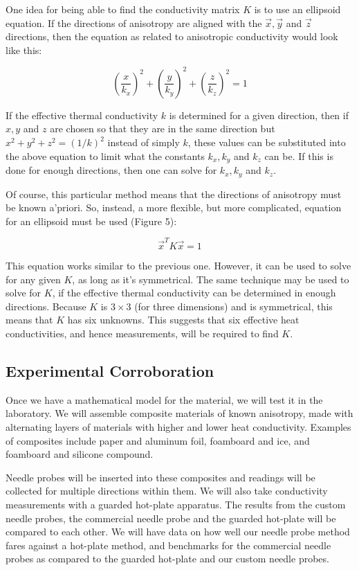 \documentclass[12pt, letterpaper]{article}
\begin{document}
One idea for being able to find the conductivity matrix \(K\) is to use an ellipsoid equation. If the directions of anisotropy are aligned with the \(\vec{x}, \vec{y}\) and \(\vec{z}\) directions, then the equation as related to anisotropic conductivity would look like this:

\begin{equation*}
\left(\frac{x}{k_x}\right)^2 + \left(\frac{y}{k_y}\right)^2 + \left(\frac{z}{k_z}\right)^2 = 1
\end{equation*}

If the effective thermal conductivity \(k\) is determined for a given direction, then if \(x,y\) and \(z\) are chosen so that they are in the same direction but \(x^2 + y^2 +z^2 = (1/k)^2\) instead of simply \(k\), these values can be substituted into the above equation to limit what the constants \(k_x, k_y\) and \(k_z\) can be. If this is done for enough directions, then one can solve for \(k_x, k_y\) and \(k_z\).

Of course, this particular method means that the directions of anisotropy must be known a'priori. So, instead, a more flexible, but more complicated, equation for an ellipsoid must be used (Figure 5):

\begin{equation*} \vec{x}^TK\vec{x}=1 \end{equation*}

This equation works similar to the previous one. However, it can be used to solve for any given \(K\), as long as it's symmetrical. The same technique may be used to solve for \(K\), if the effective thermal conductivity can be determined in enough directions. Because \(K\) is \(3 \times 3\) (for three dimensions) and is symmetrical, this means that \(K\) has six unknowns. This suggests that six effective heat conductivities, and hence measurements, will be required to find \(K\).


\subsection{Experimental Corroboration}

Once we have a mathematical model for the material, we will test it in the laboratory. We will assemble composite materials of known anisotropy, made with alternating layers of materials with higher and lower heat conductivity. Examples of composites include paper and aluminum foil, foamboard and ice, and foamboard and silicone compound.

Needle probes will be inserted into these composites and readings will be collected for multiple directions within them. We will also take conductivity measurements with a guarded hot-plate apparatus. The results from the custom needle probes, the commercial needle probe and the guarded hot-plate will be compared to each other. We will have data on how well our needle probe method fares against a hot-plate method, and benchmarks for the commercial needle probes as compared to the guarded hot-plate and our custom needle probes.
\end{document}
